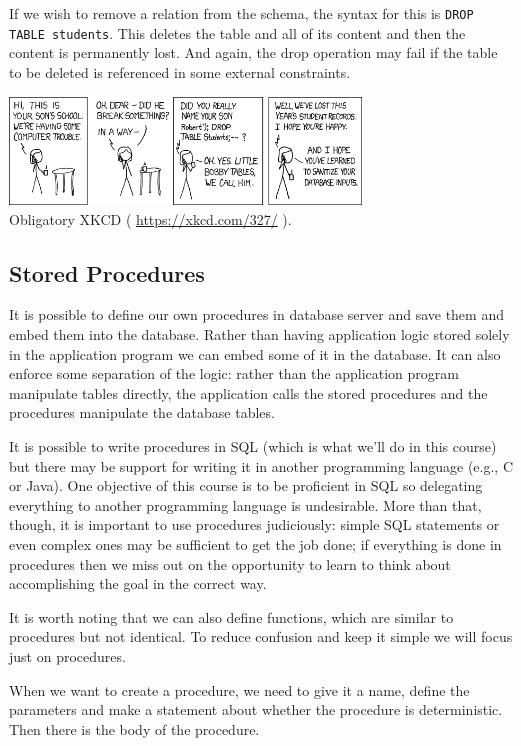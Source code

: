 If we wish to remove a relation from the schema, the syntax for this is \texttt{DROP TABLE students}. This deletes the table and all of its content and then the content is permanently lost. And again, the drop operation may fail if the table to be deleted is referenced in some external constraints.

\begin{center}
\includegraphics[width=0.7\textwidth]{images/exploits_of_a_mom}\\
Obligatory XKCD ( \url{https://xkcd.com/327/} ).
\end{center}

\subsection*{Stored Procedures}
It is possible to define our own procedures in database server and save them and embed them into the database. Rather than having application logic stored solely in the application program we can embed some of it in the database. It can also enforce some separation of the logic: rather than the application program manipulate tables directly, the application calls the stored procedures and the procedures manipulate the database tables.

It is possible to write procedures in SQL (which is what we'll do in this course) but there may be support for writing it in another programming language (e.g., C or Java). One objective of this course is to be proficient in SQL so delegating everything to another programming language is undesirable. More than that, though, it is important to use procedures judiciously: simple SQL statements or even complex ones may be sufficient to get the job done; if everything is done in procedures then we miss out on the opportunity to learn to think about accomplishing the goal in the correct way. 

It is worth noting that we can also define functions, which are similar to procedures but not identical. To reduce confusion and keep it simple we will focus just on procedures. 

When we want to create a procedure, we need to give it a name, define the parameters and make a statement about whether the procedure is deterministic. Then there is the body of the procedure.

